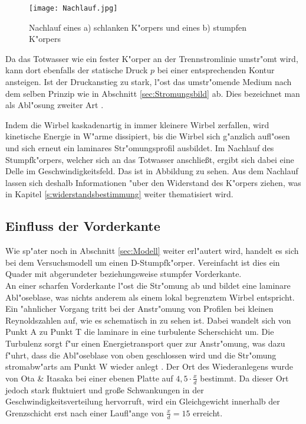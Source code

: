  \begin{figure}[h]
	\centering
	\texttt{[image: Nachlauf.jpg]}
	\caption{Nachlauf eines a) schlanken K"orpers und eines b) stumpfen K"orpers \cite{Hucho.2011}}
	\label{fig:Nachlauf}
\end{figure}

Da das Totwasser wie ein fester K"orper an der Trennstromlinie umstr"omt wird, kann dort ebenfalls der statische Druck $p$ bei einer entsprechenden Kontur ansteigen. Ist der Druckanstieg zu stark, l"ost das umstr"omende Medium nach dem selben Prinzip wie in Abschnitt \ref{sec:Stromungsbild} ab. Dies bezeichnet man als Abl"osung zweiter Art \cite{Leder.1992}.

Indem die Wirbel kaskadenartig in immer kleinere Wirbel zerfallen, wird kinetische Energie in W"arme dissipiert, bis die Wirbel sich g"anzlich aufl"osen und sich erneut ein laminares Str"omungsprofil ausbildet. Im Nachlauf des Stumpfk"orpers, welcher sich an das Totwasser anschlie\ss{}t, ergibt sich dabei eine Delle im Geschwindigkeitsfeld. Das ist in Abbildung  zu sehen. Aus dem Nachlauf lassen sich deshalb Informationen "uber den Widerstand des K"orpers ziehen, was in Kapitel \ref{s:widerstandsbestimmung} weiter thematisiert wird.

\subsection{Einfluss der Vorderkante} 
\label{sec:Vorderkante}
Wie sp"ater noch in Abschnitt \ref{sec:Modell} weiter erl"autert wird, handelt es sich bei dem Versuchsmodell um einen D-Stumpfk"orper. Vereinfacht ist dies ein Quader mit abgerundeter beziehungsweise stumpfer Vorderkante.\\ 
An einer scharfen Vorderkante l"ost die Str"omung ab und bildet eine laminare Abl"oseblase, was nichts anderem als einem lokal begrenztem Wirbel entspricht. Ein "ahnlicher Vorgang tritt bei der Anstr"omung von Profilen bei kleinen Reynoldszahlen auf, wie es schematisch in  zu sehen ist. Dabei wandelt sich von Punkt A zu Punkt T die laminare in eine turbulente Scherschicht um. Die Turbulenz sorgt f"ur einen Energietransport quer zur Anstr"omung, was dazu f"uhrt, dass die Abl"oseblase von oben geschlossen wird und die Str"omung stromabw"arts am Punkt W wieder anlegt \cite{Siegman.2015}. Der Ort des Wiederanlegens wurde von Ota \& Itasaka \cite{Ota.1976} bei einer ebenen Platte auf $4,5 \cdot \frac{x}{d}$ bestimmt. Da dieser Ort jedoch stark fluktuiert und gro\ss{}e Schwankungen in der Geschwindigkeitsverteilung hervorruft, wird ein Gleichgewicht innerhalb der Grenzschicht erst nach einer Laufl"ange von $\frac{x}{d} = 15$ erreicht.
  

